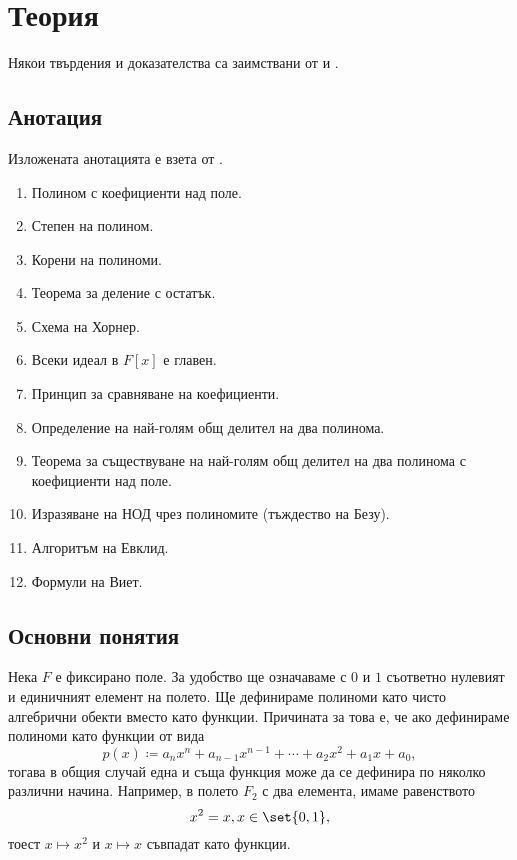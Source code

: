 \documentclass{../../common/topic}
\begin{document}
\maketitle

\section{Теория}

Някои твърдения и доказателства са заимствани от \cite{Knapp2016BasicAlgebra} и \cite{RoyachkiNotes}.

\subsection{Анотация}

Изложената анотацията е взета от \cite{Syllabus}.

\begin{enumerate}
  \item Полином с коефициенти над поле.
  \item Степен на полином.
  \item Корени на полиноми.
  \item Теорема за деление с остатък.
  \item Схема на Хорнер.
  \item Всеки идеал в \( F[x] \) е главен.
  \item Принцип за сравняване на коефициенти.
  \item Определение на най-голям общ делител на два полинома.
  \item Теорема за съществуване на най-голям общ делител на два полинома с коефициенти над поле.
  \item Изразяване на НОД чрез полиномите (тъждество на Безу).
  \item Алгоритъм на Евклид.
  \item Формули на Виет.
\end{enumerate}

\subsection{Основни понятия}

Нека \( F \) е фиксирано поле. За удобство ще означаваме с \( 0 \) и \( 1 \) съответно нулевият и единичният елемент на полето. Ще дефинираме полиноми като чисто алгебрични обекти вместо като функции. Причината за това е, че ако дефинираме полиноми като функции от вида
\begin{equation*}
  p(x) \coloneqq a_n x^n + a_{n-1} x^{n-1} + \cdots + a_2 x^2 + a_1 x + a_0,
\end{equation*}
тогава в общия случай една и съща функция може да се дефинира по няколко различни начина. Например, в полето \( F_2 \) с два елемента, имаме равенството
\begin{equation*}
  x^2 = x, x \in \set{ 0, 1 },
\end{equation*}
тоест \( x \mapsto x^2 \) и \( x \mapsto x \) съвпадат като функции.
\end{document}
